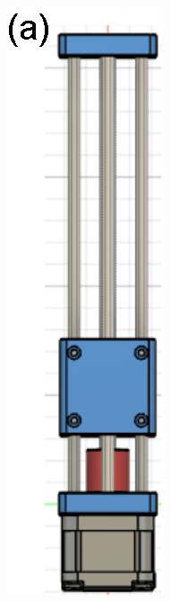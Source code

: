 \begin{figure}[H]
\hfill%
\includegraphics[scale=0.83]{Figs/microespectrometro/diseo1eje.png}
\hfill%

\end{figure}
